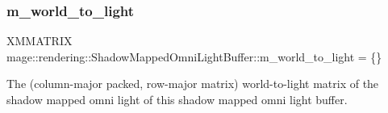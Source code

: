 \subsubsection{\texorpdfstring{m\+\_\+world\+\_\+to\+\_\+light}{m\_world\_to\_light}}
{\footnotesize\ttfamily X\+M\+M\+A\+T\+R\+IX mage\+::rendering\+::\+Shadow\+Mapped\+Omni\+Light\+Buffer\+::m\+\_\+world\+\_\+to\+\_\+light = \{\}}

The (column-\/major packed, row-\/major matrix) world-\/to-\/light matrix of the shadow mapped omni light of this shadow mapped omni light buffer. 